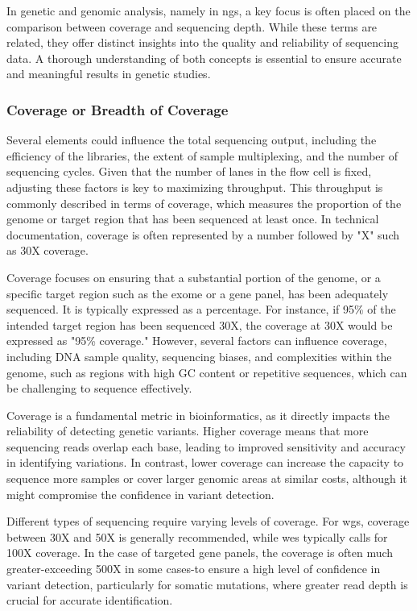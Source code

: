 In genetic and genomic analysis, namely in \ac{ngs}, a key focus is often placed on the comparison between coverage and sequencing depth. While these terms are related, they offer distinct insights into the quality and reliability of sequencing data. A thorough understanding of both concepts is essential to ensure accurate and meaningful results in genetic studies.

\subsubsection{\textbf{Coverage or Breadth of Coverage}} \label{subsubsec:ngs_coverage}

Several elements could influence the total sequencing output, including the efficiency of the libraries, the extent of sample multiplexing, and the number of sequencing cycles. Given that the number of lanes in the flow cell is fixed, adjusting these factors is key to maximizing throughput. This throughput is commonly described in terms of coverage, which measures the proportion of the genome or target region that has been sequenced at least once. In technical documentation, coverage is often represented by a number followed by "X" such as 30X coverage. \cite{Larson2023}

Coverage focuses on ensuring that a substantial portion of the genome, or a specific target region such as the exome or a gene panel, has been adequately sequenced. It is typically expressed as a percentage. For instance, if 95\% of the intended target region has been sequenced 30X, the coverage at 30X would be expressed as "95\% coverage." However, several factors can influence coverage, including DNA sample quality, sequencing biases, and complexities within the genome, such as regions with high GC content or repetitive sequences, which can be challenging to sequence effectively. \cite{3billion2023}

Coverage is a fundamental metric in bioinformatics, as it directly impacts the reliability of detecting genetic variants. Higher coverage means that more sequencing reads overlap each base, leading to improved sensitivity and accuracy in identifying variations. In contrast, lower coverage can increase the capacity to sequence more samples or cover larger genomic areas at similar costs, although it might compromise the confidence in variant detection. \cite{Larson2023}

Different types of sequencing require varying levels of coverage. For \ac{wgs}, coverage between 30X and 50X is generally recommended, while \ac{wes} typically calls for 100X coverage. In the case of targeted gene panels, the coverage is often much greater-exceeding 500X in some cases-to ensure a high level of confidence in variant detection, particularly for somatic mutations, where greater read depth is crucial for accurate identification. \cite{Larson2023}


